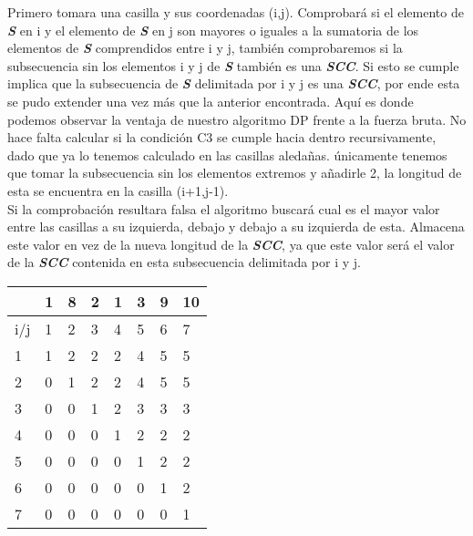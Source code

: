 \documentclass[10pt]{article}
\begin{document}
Primero tomara una casilla y sus coordenadas (i,j). Comprobar\'a si el elemento de \textbf{\textit{S}} en i y el elemento de \textbf{\textit{S}} en j son mayores o iguales a la sumatoria de los elementos de \textbf{\textit{S}} comprendidos entre i y j, tambi\'en comprobaremos si la subsecuencia sin los elementos i y j de \textbf{\textit{S}} tambi\'en es una \textbf{\textit{SCC}}. Si esto se cumple implica que la subsecuencia de \textbf{\textit{S}} delimitada por i y j es una \textbf{\textit{SCC}}, por ende esta se pudo extender una vez m\'as que la anterior encontrada. Aqu\'i es donde podemos observar la ventaja de nuestro algoritmo DP frente a la fuerza bruta. No hace falta calcular si la condici\'on C3 se cumple hacia dentro recursivamente, dado que ya lo tenemos calculado en las casillas aleda\~nas. \'unicamente tenemos que tomar la subsecuencia sin los elementos extremos y a\~nadirle 2, la longitud de esta se encuentra en la casilla (i+1,j-1).\\
 Si la comprobaci\'on resultara falsa el algoritmo buscar\'a cual es el mayor valor entre las casillas a su izquierda, debajo y debajo a su izquierda de esta. Almacena este valor en vez de la nueva longitud de la \textbf{\textit{SCC}}, ya que este valor ser\'a el valor de la \textbf{\textit{SCC}} contenida en esta subsecuencia delimitada por i y j.\\


\begin{table}[htbp]
\begin{center}
\begin{tabular}{|l|l|l|l|l|l|l|l|}
\hline
 & 1 & 8 & 2 & 1 & 3 & 9 & 10 \\ \hline
 i/j & 1 & 2 & 3 & 4 & 5 & 6 & 7 \\ \hline
 1 & 1 & 2 & 2 & 2 & 4 & 5 & 5 \\ \hline
 2 & 0 & 1 & 2 & 2 & 4 & 5 & 5 \\ \hline
 3 & 0 & 0 & 1 & 2 & 3 & 3 & 3 \\ \hline
 4 & 0 & 0 & 0 & 1 & 2 & 2 & 2 \\ \hline
 5 & 0 & 0 & 0 & 0 & 1 & 2 & 2 \\ \hline
 6 & 0 & 0 & 0 & 0 & 0 & 1 & 2 \\ \hline
 7 & 0 & 0 & 0 & 0 & 0 & 0 & 1 \\ \hline
\end{tabular}
\end{center}
\end{table}
\end{document}
